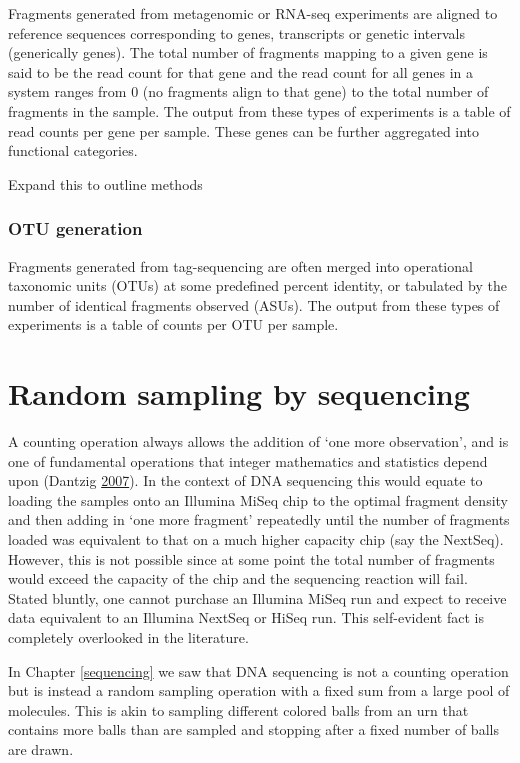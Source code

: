 \documentclass[onecolumn]{book}
\theoremstyle{definition}
\theoremstyle{definition}
\theoremstyle{definition}
\theoremstyle{remark}
\begin{document}
Fragments generated from metagenomic or RNA-seq experiments are aligned
to reference sequences corresponding to genes, transcripts or genetic
intervals (generically genes). The total number of fragments mapping to
a given gene is said to be the read count for that gene and the read
count for all genes in a system ranges from 0 (no fragments align to
that gene) to the total number of fragments in the sample. The output
from these types of experiments is a table of read counts per gene per
sample. These genes can be further aggregated into functional
categories.

Expand this to outline methods

\hypertarget{otu-generation}{%
\subsection{OTU generation}\label{otu-generation}}

Fragments generated from tag-sequencing are often merged into
operational taxonomic units (OTUs) at some predefined percent identity,
or tabulated by the number of identical fragments observed (ASUs). The
output from these types of experiments is a table of counts per OTU per
sample.

\hypertarget{random}{%
\chapter{Random sampling by sequencing}\label{random}}

A counting operation always allows the addition of `one more
observation', and is one of fundamental operations that integer
mathematics and statistics depend upon (Dantzig
\protect\hyperlink{ref-number}{2007}). In the context of DNA sequencing
this would equate to loading the samples onto an Illumina MiSeq chip to
the optimal fragment density and then adding in `one more fragment'
repeatedly until the number of fragments loaded was equivalent to that
on a much higher capacity chip (say the NextSeq). However, this is not
possible since at some point the total number of fragments would exceed
the capacity of the chip and the sequencing reaction will fail. Stated
bluntly, one cannot purchase an Illumina MiSeq run and expect to receive
data equivalent to an Illumina NextSeq or HiSeq run. This self-evident
fact is completely overlooked in the literature.

In Chapter \ref{sequencing} we saw that DNA sequencing is not a counting
operation but is instead a random sampling operation with a fixed sum
from a large pool of molecules. This is akin to sampling different
colored balls from an urn that contains more balls than are sampled and
stopping after a fixed number of balls are drawn.
\end{document}
